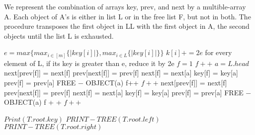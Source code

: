 \documentclass[a4paper, justified]{tufte-handout}
\begin{document}
\begin{solution}
  We represent the combination of arrays key, prev, and next by a multible-array A. Each object of A's is either in list L or in the free list F, but not in both. The procedure  transposes the first object in LL with the first object in A, the second objects until the list L is exhausted.

  \begin{algorithm}
    \begin{algorithmic}
      \State \Return
      \EndIf
      \State $e = max\{max_{i\in [m]}\{|key[i]| \}, max_{i\in L}\{|key[i]| \}\}$
      \State $k[i] += 2e$
      \EndFor
      \State for every element of L, if its key is greater than e, reduce it by 2e
      \State $f=1$
      \State $f++$
      \EndWhile
      \State $a=L.head$
      \State next[prev[f]] = next[f]
      \State prev[next[f]] = prev[f]
      \State next[f] = next[a]
      \State key[f] = key[a]
      \State prev[f] = prev[a]
      \State FREE − OBJECT(a)
      \State f++
      \State $f++$
      \EndWhile
      \EndIf
      \State next[prev[f]] = next[f]
      \State prev[next[f]] = prev[f]
      \State next[f] = next[a]
      \State key[f] = key[a]
      \State prev[f] = prev[a]
      \State FREE − OBJECT(a)
      \State f + +
      \State $f++$
      \EndWhile
      \EndIf
      \EndWhile
      \EndProcedure
    \end{algorithmic}
  \end{algorithm}
\end{solution}

\begin{problem}[TC 10.4-2]
\end{problem}

\begin{solution}
  \begin{algorithm}
    \begin{algorithmic}
      \State \Return
      \Else
      \State $Print (T.root.key)$
      \State $PRINT-TREE(T.root.left)$
      \State $PRINT-TREE(T.root.right)$
      \EndIf
      \EndProcedure
    \end{algorithmic}
  \end{algorithm}
\end{solution}
\end{document}

